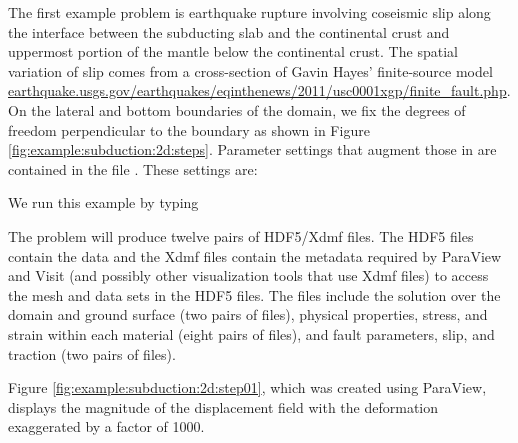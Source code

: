 The first example problem is earthquake rupture involving coseismic
slip along the interface between the subducting slab and the continental
crust and uppermost portion of the mantle below the continental crust.
The spatial variation of slip comes from a cross-section of Gavin
Hayes' finite-source model \url{earthquake.usgs.gov/earthquakes/eqinthenews/2011/usc0001xgp/finite_fault.php}.
On the lateral and bottom boundaries of the domain, we fix the degrees
of freedom perpendicular to the boundary as shown in Figure \vref{fig:example:subduction:2d:steps}.
Parameter settings that augment those in  are
contained in the file . These settings are:
\begin{inventory}
\end{inventory}
We run this example by typing
The problem will produce twelve pairs of HDF5/Xdmf files. The HDF5
files contain the data and the Xdmf files contain the metadata required
by ParaView and Visit (and possibly other visualization tools that
use Xdmf files) to access the mesh and data sets in the HDF5 files.
The files include the solution over the domain and ground surface
(two pairs of files), physical properties, stress, and strain within
each material (eight pairs of files), and fault parameters, slip,
and traction (two pairs of files). 

Figure \vref{fig:example:subduction:2d:step01}, which was created using
ParaView, displays the magnitude of the displacement field with the
deformation exaggerated by a factor of 1000. 

